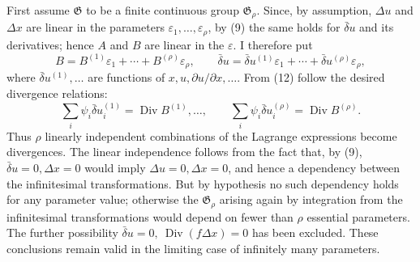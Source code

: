 \documentclass[11pt]{article}
\newcommand{\D}{\Delta}
\providecommand{\eps}{\varepsilon}
\providecommand{\Div}{\operatorname{Div}}
\providecommand{\G}{\mathfrak G}
\providecommand{\bd}{\bar{\delta}}
\providecommand{\p}{\partial}
\providecommand{\p}{\partial}
\begin{document}
First assume \(\G\) to be a finite continuous group \(\G_\rho\). Since, by assumption, \(\D u\) and \(\D x\) are linear in the parameters \(\eps_1,\ldots,\eps_\rho\), by (9) the same holds for \(\bd u\) and its derivatives; hence \(A\) and \(B\) are linear in the \(\eps\). I therefore put
\[
B=B^{(1)}\eps_1+\cdots+B^{(\rho)}\eps_\rho,\qquad
\bd u=\bd u^{(1)}\eps_1+\cdots+\bd u^{(\rho)}\eps_\rho,
\]
where \(\bd u^{(1)},\ldots\) are functions of \(x,u,\p u/\p x,\ldots\). From (12) follow the desired divergence relations:
\begin{equation}
\sum_i\psi_i\bd u_i^{(1)}=\Div B^{(1)},\ldots,\qquad
\sum_i\psi_i\bd u_i^{(\rho)}=\Div B^{(\rho)}.
\tag{13}
\end{equation}
Thus \(\rho\) linearly independent combinations of the Lagrange expressions become divergences. The linear independence follows from the fact that, by (9), \(\bd u=0,\D x=0\) would imply \(\D u=0,\D x=0\), and hence a dependency between the infinitesimal transformations. But by hypothesis no such dependency holds for any parameter value; otherwise the \(\G_\rho\) arising again by integration from the infinitesimal transformations would depend on fewer than \(\rho\) essential parameters. The further possibility \(\bd u=0,\ \Div(f\D x)=0\) has been excluded. These conclusions remain valid in the limiting case of infinitely many parameters.
\end{document}

